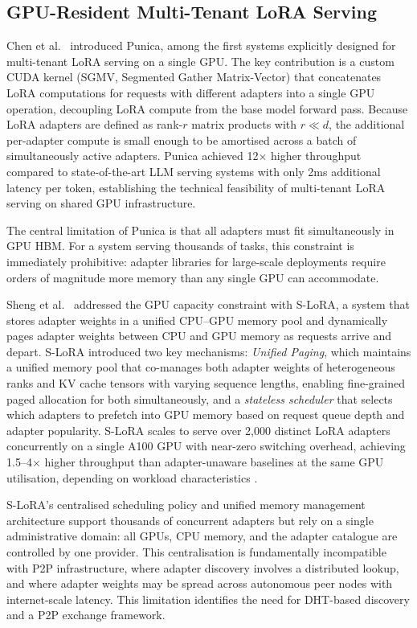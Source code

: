 \subsection{GPU-Resident Multi-Tenant LoRA Serving}
\label{sec:inference_systems:punica}

Chen et al.~\cite{Chen2023Punica} introduced Punica, among the first systems explicitly designed for
multi-tenant LoRA serving on a single GPU. The key contribution is a custom CUDA kernel
(SGMV, Segmented Gather Matrix-Vector) that concatenates LoRA computations for requests with different adapters into
a single GPU operation, decoupling LoRA compute from the base model forward pass.
Because LoRA adapters are defined as rank-$r$ matrix products with $r \ll d$, the
additional per-adapter compute is small enough to be amortised across a batch of
simultaneously active adapters. Punica achieved 12$\times$ higher throughput compared to state-of-the-art LLM serving
systems with only 2ms additional latency per token, establishing the technical
feasibility of multi-tenant LoRA serving on shared GPU infrastructure.

The central limitation of Punica is that all adapters must fit simultaneously in GPU HBM.
For a system serving thousands of tasks, this constraint is immediately prohibitive:
adapter libraries for large-scale deployments require orders of magnitude more memory
than any single GPU can accommodate.

Sheng et al.~\cite{Sheng2024} addressed the GPU capacity constraint with S-LoRA, a system that
stores adapter weights in a unified CPU--GPU memory pool and dynamically pages adapter
weights between CPU and GPU memory as requests arrive and depart. S-LoRA introduced
two key mechanisms: \textit{Unified Paging}, which maintains a unified memory pool that co-manages both adapter weights of
heterogeneous ranks and KV cache tensors with varying sequence lengths, enabling
fine-grained paged allocation for both simultaneously, and a \textit{stateless scheduler} that selects which adapters to
prefetch into GPU memory based on request queue depth and adapter popularity. S-LoRA
scales to serve over 2,000 distinct LoRA adapters concurrently on a single A100 GPU
with near-zero switching overhead, achieving 1.5--4$\times$ higher throughput than
adapter-unaware baselines at the same GPU utilisation, depending on workload
characteristics \cite{Sheng2024}.

S-LoRA's centralised scheduling policy and unified memory management architecture support
thousands of concurrent adapters but rely on a single administrative domain: all GPUs,
CPU memory, and the adapter catalogue are controlled by one provider. This centralisation
is fundamentally incompatible with P2P infrastructure, where adapter discovery involves
a distributed lookup, and where adapter weights may be spread across autonomous peer
nodes with internet-scale latency. This limitation identifies the need for DHT-based
discovery and a P2P exchange framework.


